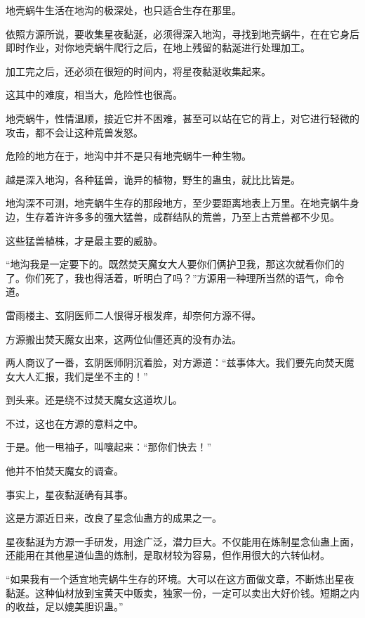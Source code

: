 
\begin{this_body}

地壳蜗牛生活在地沟的极深处，也只适合生存在那里。

依照方源所说，要收集星夜黏涎，必须得深入地沟，寻找到地壳蜗牛，在在它身后即时作业，对你地壳蜗牛爬行之后，在地上残留的黏涎进行处理加工。

加工完之后，还必须在很短的时间内，将星夜黏涎收集起来。

这其中的难度，相当大，危险性也很高。

地壳蜗牛，性情温顺，接近它并不困难，甚至可以站在它的背上，对它进行轻微的攻击，都不会让这种荒兽发怒。

危险的地方在于，地沟中并不是只有地壳蜗牛一种生物。

越是深入地沟，各种猛兽，诡异的植物，野生的蛊虫，就比比皆是。

地沟深不可测，地壳蜗牛生存的那段地方，至少要距离地表上万里。在地壳蜗牛身边，生存着许许多多的强大猛兽，成群结队的荒兽，乃至上古荒兽都不少见。

这些猛兽植株，才是最主要的威胁。

“地沟我是一定要下的。既然焚天魔女大人要你们俩护卫我，那这次就看你们的了。你们死了，我也得活着，听明白了吗？”方源用一种理所当然的语气，命令道。

雷雨楼主、玄阴医师二人恨得牙根发痒，却奈何方源不得。

方源搬出焚天魔女出来，这两位仙僵还真的没有办法。

两人商议了一番，玄阴医师阴沉着脸，对方源道：“兹事体大。我们要先向焚天魔女大人汇报，我们是坐不主的！”

到头来。还是绕不过焚天魔女这道坎儿。

不过，这也在方源的意料之中。

于是。他一甩袖子，叫嚷起来：“那你们快去！”

他并不怕焚天魔女的调查。

事实上，星夜黏涎确有其事。

这是方源近日来，改良了星念仙蛊方的成果之一。

星夜黏涎为方源一手研发，用途广泛，潜力巨大。不仅能用在炼制星念仙蛊上面，还能用在其他星道仙蛊的炼制，是取材较为容易，但作用很大的六转仙材。

“如果我有一个适宜地壳蜗牛生存的环境。大可以在这方面做文章，不断炼出星夜黏涎。这种仙材放到宝黄天中贩卖，独家一份，一定可以卖出大好价钱。短期之内的收益，足以媲美胆识蛊。”


\end{this_body}
